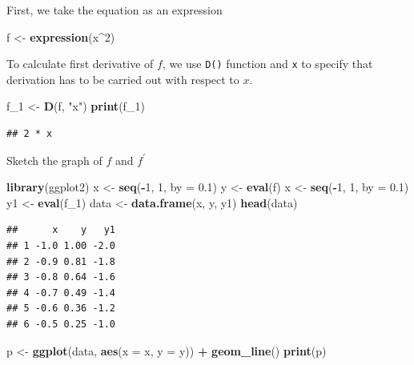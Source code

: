 \documentclass[]{book}
\newenvironment{Shaded}{\begin{snugshade}}{\end{snugshade}}
\newcommand{\DataTypeTok}[1]{\textcolor[rgb]{0.13,0.29,0.53}{#1}}
\newcommand{\DecValTok}[1]{\textcolor[rgb]{0.00,0.00,0.81}{#1}}
\newcommand{\FloatTok}[1]{\textcolor[rgb]{0.00,0.00,0.81}{#1}}
\newcommand{\KeywordTok}[1]{\textcolor[rgb]{0.13,0.29,0.53}{\textbf{#1}}}
\newcommand{\NormalTok}[1]{#1}
\newcommand{\OperatorTok}[1]{\textcolor[rgb]{0.81,0.36,0.00}{\textbf{#1}}}
\newcommand{\StringTok}[1]{\textcolor[rgb]{0.31,0.60,0.02}{#1}}
\begin{document}
First, we take the equation as an expression

\begin{Shaded}
\begin{Highlighting}[]
\NormalTok{f <-}\StringTok{ }\KeywordTok{expression}\NormalTok{(x}\OperatorTok{^}\DecValTok{2}\NormalTok{)}
\end{Highlighting}
\end{Shaded}

To calculate first derivative of \(f\), we use \texttt{D()} function and \texttt{x} to specify that derivation has to be carried out with respect to
\(x\).

\begin{Shaded}
\begin{Highlighting}[]
\NormalTok{f_}\DecValTok{1}\NormalTok{ <-}\StringTok{ }\KeywordTok{D}\NormalTok{(f, }\StringTok{"x"}\NormalTok{)}
\KeywordTok{print}\NormalTok{(f_}\DecValTok{1}\NormalTok{)}
\end{Highlighting}
\end{Shaded}

\begin{verbatim}
## 2 * x
\end{verbatim}

Sketch the graph of \(f\) and \(f^\prime\)

\begin{Shaded}
\begin{Highlighting}[]
\KeywordTok{library}\NormalTok{(ggplot2)}
\NormalTok{x <-}\StringTok{ }\KeywordTok{seq}\NormalTok{(}\OperatorTok{-}\DecValTok{1}\NormalTok{, }\DecValTok{1}\NormalTok{, }\DataTypeTok{by =} \FloatTok{0.1}\NormalTok{)}
\NormalTok{y <-}\StringTok{ }\KeywordTok{eval}\NormalTok{(f)}
\NormalTok{x <-}\StringTok{ }\KeywordTok{seq}\NormalTok{(}\OperatorTok{-}\DecValTok{1}\NormalTok{, }\DecValTok{1}\NormalTok{, }\DataTypeTok{by =} \FloatTok{0.1}\NormalTok{)}
\NormalTok{y1 <-}\StringTok{ }\KeywordTok{eval}\NormalTok{(f_}\DecValTok{1}\NormalTok{)}
\NormalTok{data <-}\StringTok{ }\KeywordTok{data.frame}\NormalTok{(x, y, y1)}
\KeywordTok{head}\NormalTok{(data)}
\end{Highlighting}
\end{Shaded}

\begin{verbatim}
##      x    y   y1
## 1 -1.0 1.00 -2.0
## 2 -0.9 0.81 -1.8
## 3 -0.8 0.64 -1.6
## 4 -0.7 0.49 -1.4
## 5 -0.6 0.36 -1.2
## 6 -0.5 0.25 -1.0
\end{verbatim}

\begin{Shaded}
\begin{Highlighting}[]
\NormalTok{p <-}\StringTok{ }\KeywordTok{ggplot}\NormalTok{(data, }\KeywordTok{aes}\NormalTok{(}\DataTypeTok{x =}\NormalTok{ x, }\DataTypeTok{y =}\NormalTok{ y)) }\OperatorTok{+}
\StringTok{  }\KeywordTok{geom_line}\NormalTok{()}
\KeywordTok{print}\NormalTok{(p)}
\end{Highlighting}
\end{Shaded}
\end{document}
